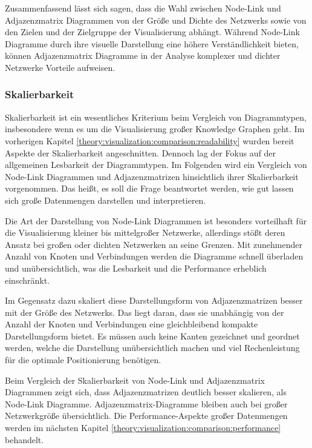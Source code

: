 Zusammenfassend lässt sich sagen, dass die Wahl zwischen Node-Link und Adjazenzmatrix Diagrammen von der Größe und Dichte des Netzwerks sowie von den Zielen und der Zielgruppe der Visualisierung abhängt. Während Node-Link Diagramme durch ihre visuelle Darstellung eine höhere Verständlichkeit bieten, können Adjazenzmatrix Diagramme in der Analyse komplexer und dichter Netzwerke Vorteile aufweisen.

\subsubsection{Skalierbarkeit}
\label{theory:visualization:comparison:scalability}

Skalierbarkeit ist ein wesentliches Kriterium beim Vergleich von Diagrammtypen, insbesondere wenn es um die Visualisierung großer Knowledge Graphen geht. Im vorherigen Kapitel \ref{theory:visualization:comparison:readability} wurden bereit Aspekte der Skalierbarkeit angeschnitten. Dennoch lag der Fokus auf der allgemeinen Lesbarkeit der Diagrammtypen. Im Folgenden wird ein Vergleich von Node-Link Diagrammen und Adjazenzmatrizen hinsichtlich ihrer Skalierbarkeit vorgenommen. Das heißt, es soll die Frage beantwortet werden, wie gut lassen sich große Datenmengen darstellen und interpretieren.

Die Art der Darstellung von Node-Link Diagrammen ist besonders vorteilhaft für die Visualisierung kleiner bis mittelgroßer Netzwerke, allerdings stößt deren Ansatz bei großen oder dichten Netzwerken an seine Grenzen. Mit zunehmender Anzahl von Knoten und Verbindungen werden die Diagramme schnell überladen und unübersichtlich, was die Lesbarkeit und die Performance erheblich einschränkt.

Im Gegensatz dazu skaliert diese Darstellungsform von Adjazenzmatrizen besser mit der Größe des Netzwerks. Das liegt daran, dass sie unabhängig von der Anzahl der Knoten und Verbindungen eine gleichbleibend kompakte Darstellungsform bietet. Es müssen auch keine Kanten gezeichnet und geordnet werden, welche die Darstellung unübersichtlich machen und viel Rechenleistung für die optimale Positionierung benötigen.

Beim Vergleich der Skalierbarkeit von Node-Link und Adjazenzmatrix Diagrammen zeigt sich, dass Adjazenzmatrizen deutlich besser skalieren, als Node-Link Diagramme. Adjazenzmatrix-Diagramme bleiben auch bei großer Netzwerkgröße übersichtlich. Die Performance-Aspekte großer Datenmengen werden im nächsten Kapitel \ref{theory:visualization:comparison:performance} behandelt.

